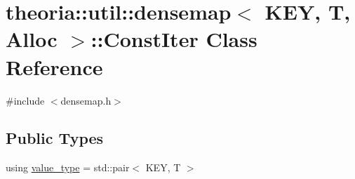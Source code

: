 \hypertarget{classtheoria_1_1util_1_1densemap_1_1ConstIter}{}\section{theoria\+:\+:util\+:\+:densemap$<$ K\+EY, T, Alloc $>$\+:\+:Const\+Iter Class Reference}
\label{classtheoria_1_1util_1_1densemap_1_1ConstIter}


{\ttfamily \#include $<$densemap.\+h$>$}

\subsection*{Public Types}
\begin{DoxyCompactItemize}
\item 
using \hyperlink{classtheoria_1_1util_1_1densemap_1_1ConstIter_a061fb76ecf5498d6033472fa66635d4a}{value\+\_\+type} = std\+::pair$<$ K\+EY, T $>$
\end{DoxyCompactItemize}

